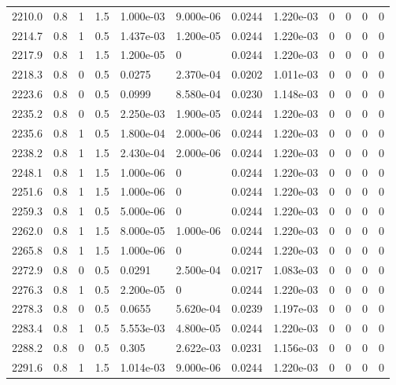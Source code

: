 \documentclass[preview]{standalone}
\begin{document}
{{{{{{{{{{{{{\begin{tabular}{L{1.2cm}C{1.2cm} C{0.3cm}C{0.5cm} C{1.4cm}C{1.4cm} C{1.4cm}C{1.4cm} C{1.6cm}C{1.6cm} C{1.6cm}C{1.6cm}}
  2210.0  &   0.8  & 1     & 1.5 &  1.000e-03  & 9.000e-06  &  0.0244&   1.220e-03& 0 & 0   &  0 & 0  \\ 
  2214.7  &   0.8  & 1     & 0.5 &  1.437e-03  & 1.200e-05  &  0.0244&   1.220e-03& 0 & 0   &  0 & 0  \\ 
  2217.9  &   0.8  & 1     & 1.5 &  1.200e-05  & 0  &  0.0244&   1.220e-03& 0 & 0   &  0 & 0  \\ 
  2218.3  &   0.8  & 0     & 0.5 &  0.0275  & 2.370e-04  &  0.0202&   1.011e-03& 0 & 0   &  0 & 0  \\ 
  2223.6  &   0.8  & 0     & 0.5 &  0.0999  & 8.580e-04  &  0.0230&   1.148e-03& 0 & 0   &  0 & 0  \\ 
  2235.2  &   0.8  & 0     & 0.5 &  2.250e-03  & 1.900e-05  &  0.0244&   1.220e-03& 0 & 0   &  0 & 0  \\ 
  2235.6  &   0.8  & 1     & 0.5 &  1.800e-04  & 2.000e-06  &  0.0244&   1.220e-03& 0 & 0   &  0 & 0  \\ 
  2238.2  &   0.8  & 1     & 1.5 &  2.430e-04  & 2.000e-06  &  0.0244&   1.220e-03& 0 & 0   &  0 & 0  \\ 
  2248.1  &   0.8  & 1     & 1.5 &  1.000e-06  & 0  &  0.0244&   1.220e-03& 0 & 0   &  0 & 0  \\ 
  2251.6  &   0.8  & 1     & 1.5 &  1.000e-06  & 0  &  0.0244&   1.220e-03& 0 & 0   &  0 & 0  \\ 
  2259.3  &   0.8  & 1     & 0.5 &  5.000e-06  & 0  &  0.0244&   1.220e-03& 0 & 0   &  0 & 0  \\ 
  2262.0  &   0.8  & 1     & 1.5 &  8.000e-05  & 1.000e-06  &  0.0244&   1.220e-03& 0 & 0   &  0 & 0  \\ 
  2265.8  &   0.8  & 1     & 1.5 &  1.000e-06  & 0  &  0.0244&   1.220e-03& 0 & 0   &  0 & 0  \\ 
  2272.9  &   0.8  & 0     & 0.5 &  0.0291  & 2.500e-04  &  0.0217&   1.083e-03& 0 & 0   &  0 & 0  \\ 
  2276.3  &   0.8  & 1     & 0.5 &  2.200e-05  & 0  &  0.0244&   1.220e-03& 0 & 0   &  0 & 0  \\ 
  2278.3  &   0.8  & 0     & 0.5 &  0.0655  & 5.620e-04  &  0.0239&   1.197e-03& 0 & 0   &  0 & 0  \\ 
  2283.4  &   0.8  & 1     & 0.5 &  5.553e-03  & 4.800e-05  &  0.0244&   1.220e-03& 0 & 0   &  0 & 0  \\ 
  2288.2  &   0.8  & 0     & 0.5 &  0.305  & 2.622e-03  &  0.0231&   1.156e-03& 0 & 0   &  0 & 0  \\ 
  2291.6  &   0.8  & 1     & 1.5 &  1.014e-03  & 9.000e-06  &  0.0244&   1.220e-03& 0 & 0   &  0 & 0  \\ 

\end{tabular}}}}}}}}}}}}}}
\end{document}
